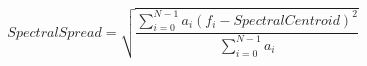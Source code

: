 \begin{equation}
\mathit{SpectralSpread} = \sqrt{\frac{\sum_{i=0}^{N-1} a_i (f_i - \mathit{SpectralCentroid})^2}{\sum_{i=0}^{N-1} a_i}}
\label{eq:spectral_spread}
\end{equation}
